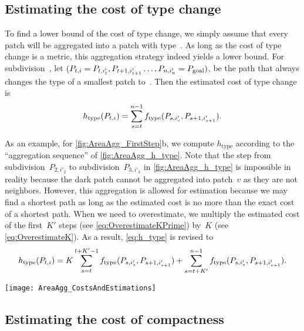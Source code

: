 \subsection{Estimating the cost of type change}
\label{sec:AreaAgg_h_type}

To find a lower bound of the cost of type change, 
we simply assume that 
every patch will be aggregated into a patch with type~\Tgoal.
As long as the cost of type change is a metric, this aggregation 
strategy indeed yields a lower bound.
%
For subdivision~\Pnode, let
$(P_{t,i}=P_{t,i'_t}, P_{t+1,i'_{t+1}} \dots,P_{n,i'_n}=P_\mathrm{goal})$,
be the path that always changes the type of a smallest patch 
to~\Tgoal.
Then the estimated cost of type change is
\begin{equation}
\label{eq:h_type}
h_\mathrm{type}(P_{t,i})=
\sum_{s=t}^{n-1}f_\mathrm{type}(P_{s,i'_s},P_{s+1,i'_{s+1}}).
\end{equation}

As an example, for \fig\ref{fig:AreaAgg_FirstStep}b, we compute 
$h_\mathrm{type}$ 
according to the ``aggregation sequence'' of 
\fig\ref{fig:AreaAgg_h_type}.
Note that the step from
subdivision~$P_{2,i'_2}$ to subdivision~$P_{3,i'_3}$ 
in \fig\ref{fig:AreaAgg_h_type} is impossible in reality 
because the dark patch cannot be aggregated into patch~$v$
as they are not neighbors. 
However, this aggregation is allowed for estimation 
because we may find a shortest path as long as 
the estimated cost is no more than 
the exact cost of a shortest path.
When we need to overestimate, we multiply the estimated cost of the 
first~$K'$ steps (see \eq\ref{eq:OverestimateKPrime}) 
by~$K$ (see \eq\ref{eq:OverestimateK}).
As a result, \fo\ref{eq:h_type} is revised to
\begin{equation}
\label{eq:o_type}
h_\mathrm{type}(P_{t,i})=
K\sum_{s=t}^{t+K'-1}f_\mathrm{type}(P_{s,i'_s},P_{s+1,i'_{s+1}})+
\sum_{s=t+K'}^{n-1}f_\mathrm{type}(P_{s,i'_s},P_{s+1,i'_{s+1}}).
\end{equation}


\begin{figure*}[tb]
\centering
\texttt{[image: AreaAgg\_CostsAndEstimations]}
\caption{An ``aggregation sequence'' for computing
    the estimated cost of type change~$h_{\mathrm{type}}$
    (see \eqs\ref{eq:h_type} and~\ref{eq:o_type}),
	based on the aggregation result of 
	\fig\ref{fig:AreaAgg_FirstStep}b.}
\label{fig:AreaAgg_h_type}
\end{figure*}


\subsection{Estimating the cost of compactness}
\label{sec:AreaAgg_h_comp}

